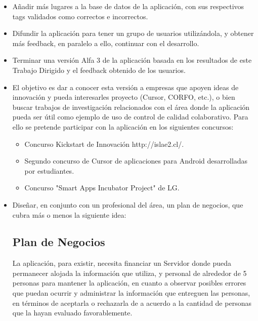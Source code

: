 \documentclass[10pt,letterpaper]{article}
\begin{document}
\begin{itemize}

\item Añadir más lugares a la base de datos de la aplicación, con sus respectivos tags validados como correctos e incorrectos.\\

\item Difundir la aplicación para tener un grupo de usuarios utilizándola, y obtener más feedback, en paralelo a ello, continuar con el desarrollo.\\

\item Terminar una versión Alfa 3 de la aplicación basada en los resultados de este Trabajo Dirigido y el feedback obtenido de los usuarios.\\

\item El objetivo es dar a conocer esta versión a empresas que apoyen ideas de innovación y pueda interesarles proyecto (Cursor, CORFO, etc.), o bien buscar trabajos de investigación relacionados con el área donde la aplicación pueda ser útil como ejemplo de uso de control de calidad colaborativo. Para ello se pretende participar con la aplicación en los siguientes concursos:\\

\begin{itemize}
\item Concurso Kickstart de Innovación http://islae2.cl/.
\item Segundo concurso de Cursor de aplicaciones para Android desarrolladas por estudiantes.
\item Concurso "Smart Apps Incubator Project" de LG.
\end{itemize}

\item Diseñar, en conjunto con un profesional del área, un plan de negocios, que cubra más o menos la siguiente idea:\\

\subsection{Plan de Negocios}

La aplicación, para existir, necesita financiar un Servidor donde pueda permanecer alojada la información que utiliza, y personal de alrededor de 5 personas para mantener la aplicación, en cuanto a observar posibles errores que puedan ocurrir y administrar la información que entreguen las personas, en términos de aceptarla o rechazarla de a acuerdo a la cantidad de personas que la hayan evaluado favorablemente.\\


\end{itemize}
\end{document}
